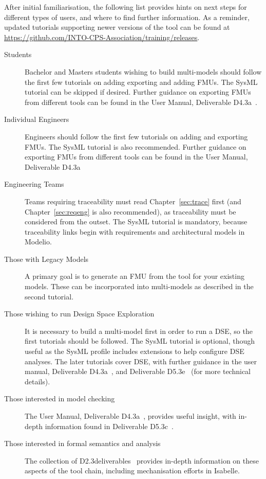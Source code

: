 After initial familiarisation, the following list provides hints on next steps for different types of users, and where to find further information. As a reminder, updated tutorials supporting newer versions of the tool can be found at \url{https://github.com/INTO-CPS-Association/training/releases}.

\begin{description}
  \item[Students] Bachelor and Masters students wishing to build multi-models should follow the first few tutorials on adding exporting and adding FMUs. The SysML tutorial can be skipped if desired. Further guidance on exporting FMUs from different tools can be found in the User Manual, Deliverable D4.3a~\cite{INTOCPSD4.3a}.
  \item[Individual Engineers] Engineers should follow the first few tutorials on adding and exporting FMUs. The SysML tutorial is also recommended. Further guidance on exporting FMUs from different tools can be found in the User Manual, Deliverable D4.3a~\cite{INTOCPSD4.3a}
  \item[Engineering Teams] Teams requiring traceability must read Chapter~\ref{sec:trace} first (and Chapter~\ref{sec:reqeng} is also recommended), as traceability must be considered from the outset. The SysML tutorial is mandatory, because traceability links begin with requirements and architectural models in Modelio.
  \item[Those with Legacy Models] A primary goal is to generate an FMU from the tool for your existing models. These can be incorporated into multi-models as described in the second tutorial.
  \item[Those wishing to run Design Space Exploration] It is necessary to build a multi-model first in order to run a DSE, so the first tutorials should be followed. The SysML tutorial is optional, though useful as the SysML profile includes extensions to help configure DSE analyses. The later tutorials cover DSE, with further guidance in the user manual, Deliverable D4.3a~\cite{INTOCPSD4.3a}, and Deliverable D5.3e~\cite{INTOCPSD5.3e} (for more technical details).
  \item[Those interested in model checking] The User Manual, Deliverable D4.3a~\cite{INTOCPSD4.3a}, provides useful insight, with in-depth information found in Deliverable D5.3c~\cite{INTOCPSD5.3c}.
  \item[Those interested in formal semantics and analysis] The collection of D2.3deliverables~\cite{INTOCPSD2.3a,INTOCPSD2.3b,INTOCPSD2.3c,INTOCPSD2.3d} provides in-depth information on these aspects of the tool chain, including mechanisation efforts in Isabelle.
\end{description}